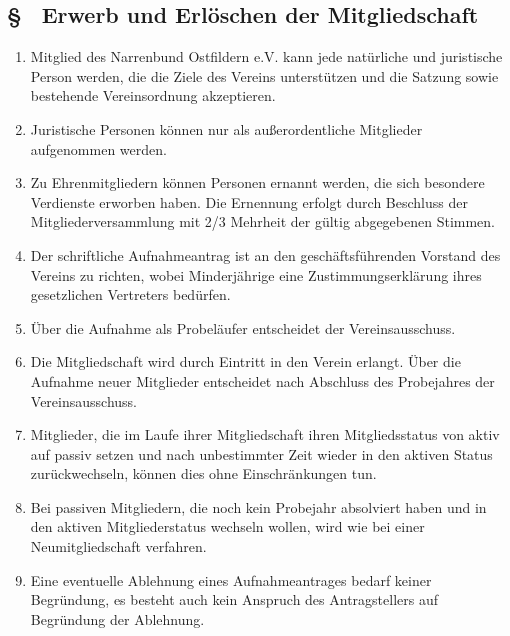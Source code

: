 \subsection{§ \thesaparagraphcounter\ Erwerb und Erlöschen der Mitgliedschaft} \label{sa:par:erwerb_erloeschen_mitgliedschaft}
\begin{enumerate}
    \item \label{sa:abs:5zbjjq} Mitglied des Narrenbund Ostfildern e.V. kann jede natürliche und juristische Person werden, die die Ziele des Vereins unterstützen und die Satzung sowie bestehende Vereinsordnung akzeptieren.

    \item \label{sa:abs:oihy3h} Juristische Personen können nur als außerordentliche Mitglieder aufgenommen werden.

    \item \label{sa:abs:clvpjv} Zu Ehrenmitgliedern können Personen ernannt werden, die sich besondere Verdienste erworben haben. Die Ernennung erfolgt durch Beschluss der Mitgliederversammlung mit 2/3 Mehrheit der gültig abgegebenen Stimmen.
    
    \item \label{sa:abs:mp5km1} Der schriftliche Aufnahmeantrag ist an den geschäftsführenden Vorstand des Vereins zu richten, wobei Minderjährige eine Zustimmungserklärung ihres gesetzlichen Vertreters bedürfen.

    \item \label{sa:abs:ehjuqm} Über die Aufnahme als Probeläufer entscheidet der Vereinsausschuss.

    \item \label{sa:abs:66yn4s} Die Mitgliedschaft wird durch Eintritt in den Verein erlangt. Über die Aufnahme neuer Mitglieder entscheidet nach Abschluss des Probejahres der Vereinsausschuss.

    \item \label{sa:abs:2ci2fz} Mitglieder, die im Laufe ihrer Mitgliedschaft ihren Mitgliedsstatus von aktiv auf passiv setzen und nach unbestimmter Zeit wieder in den aktiven Status zurückwechseln, können dies ohne Einschränkungen tun.

    \item \label{sa:abs:okoejt} Bei passiven Mitgliedern, die noch kein Probejahr absolviert haben und in den aktiven Mitgliederstatus wechseln wollen, wird wie bei einer Neumitgliedschaft verfahren.

    \item \label{sa:abs:63x1k2} Eine eventuelle Ablehnung eines Aufnahmeantrages bedarf keiner Begründung, es besteht auch kein Anspruch des Antragstellers auf Begründung der Ablehnung.


\end{enumerate}
